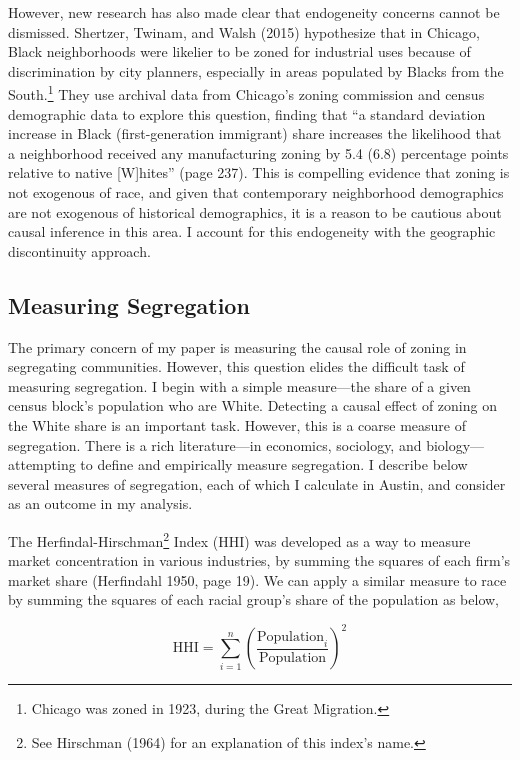 \documentclass[11pt]{article}
\begin{document}
However, new research has also made clear that endogeneity concerns cannot be dismissed. Shertzer, Twinam, and Walsh (2015) hypothesize that in Chicago, Black neighborhoods were likelier to be zoned for industrial uses because of discrimination by city planners, especially in areas populated by Blacks from the South.\footnote{Chicago was zoned in 1923, during the Great Migration.} They use archival data from Chicago’s zoning commission and census demographic data to explore this question, finding that “a standard deviation increase in Black (first-generation immigrant) share increases the likelihood that a neighborhood received any manufacturing zoning by 5.4 (6.8) percentage points relative to native [W]hites” (page 237). This is compelling evidence that zoning is not exogenous of race, and given that contemporary neighborhood demographics are not exogenous of historical demographics, it is a reason to be cautious about causal inference in this area. I account for this endogeneity with the geographic discontinuity approach.

\subsection{Measuring Segregation}
The primary concern of my paper is measuring the causal role of zoning in segregating communities. However, this question elides the difficult task of measuring segregation. I begin with a simple measure---the share of a given census block's population who are White. Detecting a causal effect of zoning on the White share is an important task. However, this is a coarse measure of segregation. There is a rich literature---in economics, sociology, and biology---attempting to define and empirically measure segregation. I describe below several measures of segregation, each of which I calculate in Austin, and consider as an outcome in my analysis. 

The Herfindal-Hirschman\footnote{See Hirschman (1964) for an explanation of this index's name.} Index (HHI) was developed as a way to measure market concentration in various industries, by summing the squares of each firm's market share (Herfindahl 1950, page 19). We can apply a similar measure to race by summing the squares of each racial group's share of the population as below, 

\begin{equation}
    \text{HHI}=\sum_{i=1}^n \left(\frac{\text{Population}_i}{\text{Population}}\right)^2
\end{equation}
\end{document}
